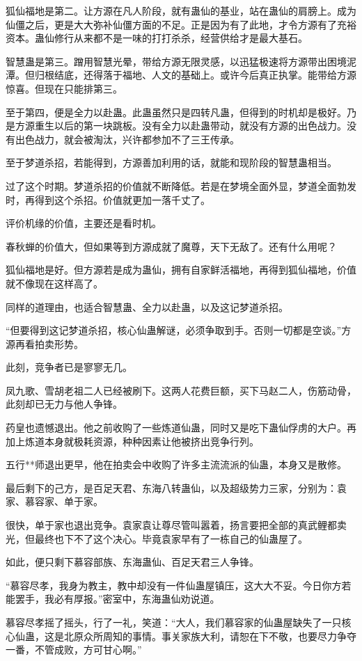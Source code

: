 \begin{this_body}
狐仙福地是第二。让方源在凡人阶段，就有蛊仙的基业，站在蛊仙的肩膀上。成为仙僵之后，更是大大弥补仙僵方面的不足。正是因为有了此地，才令方源有了充裕资本。蛊仙修行从来都不是一味的打打杀杀，经营供给才是最大基石。

智慧蛊是第三。蹭用智慧光晕，带给方源无限灵感，以迅猛极速将方源带出困境泥潭。但归根结底，还得落于福地、人文的基础上。或许今后真正执掌。能带给方源惊喜。但现在只能排第三。

至于第四，便是全力以赴蛊。此蛊虽然只是四转凡蛊，但得到的时机却是极好。乃是方源重生以后的第一块跳板。没有全力以赴蛊带动，就没有方源的出色战力。没有出色战力，就会被淘汰，兴许都参加不了三王传承。

至于梦道杀招，若能得到，方源善加利用的话，就能和现阶段的智慧蛊相当。

过了这个时期。梦道杀招的价值就不断降低。若是在梦境全面外显，梦道全面勃发时，再得到这个杀招。价值就更加一落千丈了。

评价机缘的价值，主要还是看时机。

春秋蝉的价值大，但如果等到方源成就了魔尊，天下无敌了。还有什么用呢？

狐仙福地是好。但方源若是成为蛊仙，拥有自家鲜活福地，再得到狐仙福地，价值就不像现在这样高了。

同样的道理由，也适合智慧蛊、全力以赴蛊，以及这记梦道杀招。

“但要得到这记梦道杀招，核心仙蛊解谜，必须争取到手。否则一切都是空谈。”方源再看拍卖形势。

此刻，竞争者已是寥寥无几。

凤九歌、雪胡老祖二人已经被刷下。这两人花费巨额，买下马赵二人，伤筋动骨，此刻却已无力与他人争锋。

药皇也遗憾退出。他之前收购了一些炼道仙蛊，同时又是吃下蛊仙俘虏的大户。再加上炼道本身就极耗资源，种种因素让他被挤出竞争行列。

五行**师退出更早，他在拍卖会中收购了许多主流流派的仙蛊，本身又是散修。

最后剩下的己方，是百足天君、东海八转蛊仙，以及超级势力三家，分别为：袁家、慕容家、单于家。

很快，单于家也退出竞争。袁家袁让尊尽管叫嚣着，扬言要把全部的真武鲤都卖光，但最终也下不了这个决心。毕竟袁家早有了一栋自己的仙蛊屋了。

如此，便只剩下慕容部族、东海蛊仙、百足天君三人争锋。

“慕容尽孝，我身为教主，教中却没有一件仙蛊屋镇压，这大大不妥。今日你方若能罢手，我必有厚报。”密室中，东海蛊仙劝说道。

慕容尽孝摇了摇头，行了一礼，笑道：“大人，我们慕容家的仙蛊屋缺失了一只核心仙蛊，这是北原众所周知的事情。事关家族大利，请恕在下不敬，也要尽力争夺一番，不管成败，方可甘心啊。”


\end{this_body}
